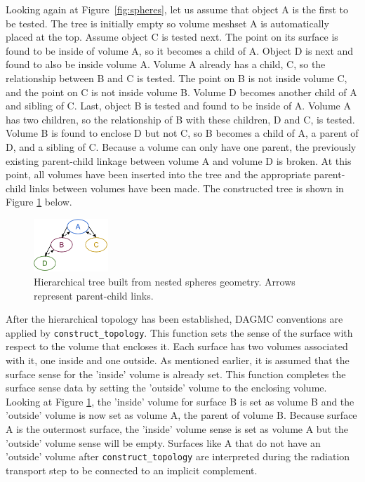 \documentclass{anstrans}
\begin{document}
Looking again at Figure~\ref{fig:spheres}, let us assume that object A is the
first to be tested. The tree is initially empty so volume meshset A is
automatically placed at the top.  Assume object C is tested next.  The point
on its surface is found to be inside of volume A, so it becomes a child of A.
Object D is next and found to also be inside volume A.  Volume A already has 
a child, C, so the relationship between B and C is tested.  The point on B is not 
inside volume C, and the point on C is not inside volume B.
Volume D becomes another child of A and sibling of C.
Last, object B is tested and found to be inside of A.  Volume A has two children, 
so the relationship of B with these children, D and C, is tested.  Volume B is
found to enclose D but not C, so B becomes a child of A, a parent of D, and a sibling
of C.  Because a volume can only have one parent, the previously existing 
parent-child linkage between volume A and volume D is broken.  At this point, 
all volumes have been inserted into the tree and the appropriate parent-child
links between volumes have been made.  The constructed tree is shown in Figure \ref{fig:tree} below.

\begin{figure}[ht] %
  \centering
  \includegraphics[width=0.25\textwidth]{../figs/tree.png}
  \caption{Hierarchical tree built from nested spheres geometry.  Arrows represent parent-child links.}
  \label{fig:tree}
\end{figure}

After the hierarchical topology has been established, DAGMC conventions are
applied by \texttt{construct\_topology}.  This function sets the sense of the surface 
with respect to the volume that encloses it.  Each surface has two volumes associated with it, one inside and one
outside.  As mentioned earlier, it is assumed that the surface sense for the 'inside' volume is
already set.  This function completes the surface sense data by setting the
'outside' volume to the enclosing volume.  Looking at Figure \ref{fig:tree},
the 'inside' volume for surface B is set as volume B and the 'outside' volume is
now set as volume A, the parent of volume B.  Because surface A is the
outermost surface, the 'inside' volume sense is set as volume A but the
'outside' volume sense will be empty.  Surfaces like A that do not have an 'outside' volume
after \texttt{construct\_topology} are interpreted during the radiation transport step to be connected to
an implicit complement.
\end{document}
